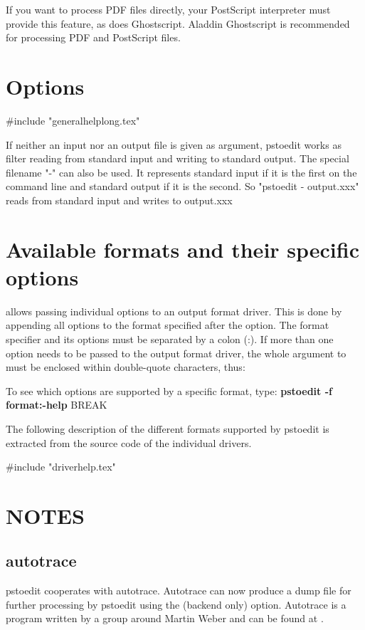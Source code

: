 \documentclass[english,a4paper]{article}
\begin{document}
If you want to process PDF files directly, your PostScript interpreter must
provide this feature, as does Ghostscript. Aladdin Ghostscript is
recommended for processing PDF and PostScript files.

\section{Options}

#include "generalhelplong.tex"


If neither an input nor an output file is given as argument, pstoedit works as filter reading from standard input and
writing to standard output.
The special filename "-" can also be used. It represents standard input if it is the first on the command line and standard output if it is the second. So "pstoedit - output.xxx" reads from standard input and writes to output.xxx


\section{Available formats and their specific options}

 allows passing individual options to an output format driver. This is done by
appending all options to the format specified after the  option. The format
specifier and its options must be separated by a colon (:). If more than one
option needs to be passed to the output format driver, the whole argument to  must be
enclosed within double-quote characters, thus:


To see which options are supported by a specific format, type:
     \textbf{pstoedit -f format:-help}
     BREAK

The following description of the different formats supported by pstoedit is extracted from the source code of the individual drivers.

#include "driverhelp.tex"

\section{NOTES}


  \subsection{autotrace}

	pstoedit cooperates with autotrace. Autotrace can now produce a dump file
	for further processing by pstoedit using the  (backend only) option.
	Autotrace is a program written by a group around Martin Weber and can be
	found at .
\end{document}
